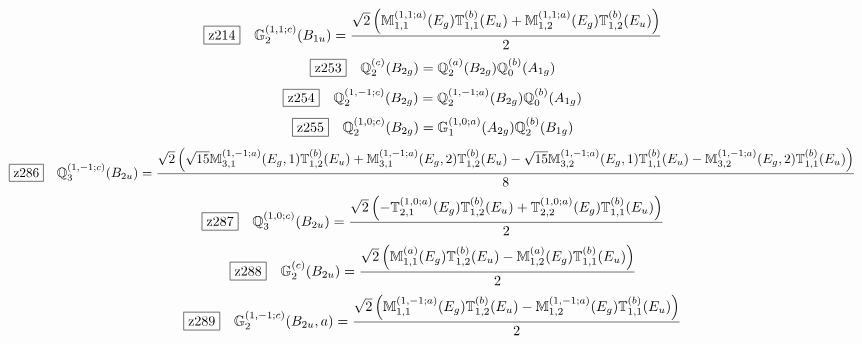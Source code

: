 \documentclass[fleqn,10pt,landscape]{jsarticle}
\begin{document}
\begin{dmath*}
\hspace*{3mm}\fbox{z214}\quad \mathbb{G}_{2}^{(1,1;c)}(B_{1u})=\frac{\sqrt{2} \left(\mathbb{M}_{1,1}^{(1,1;a)}(E_{g}) \mathbb{T}_{1,1}^{(b)}(E_{u}) + \mathbb{M}_{1,2}^{(1,1;a)}(E_{g}) \mathbb{T}_{1,2}^{(b)}(E_{u})\right)}{2}
\end{dmath*}
\begin{dmath*}
\hspace*{3mm}\fbox{z253}\quad \mathbb{Q}_{2}^{(c)}(B_{2g})=\mathbb{Q}_{2}^{(a)}(B_{2g}) \mathbb{Q}_{0}^{(b)}(A_{1g})
\end{dmath*}
\begin{dmath*}
\hspace*{3mm}\fbox{z254}\quad \mathbb{Q}_{2}^{(1,-1;c)}(B_{2g})=\mathbb{Q}_{2}^{(1,-1;a)}(B_{2g}) \mathbb{Q}_{0}^{(b)}(A_{1g})
\end{dmath*}
\begin{dmath*}
\hspace*{3mm}\fbox{z255}\quad \mathbb{Q}_{2}^{(1,0;c)}(B_{2g})=\mathbb{G}_{1}^{(1,0;a)}(A_{2g}) \mathbb{Q}_{2}^{(b)}(B_{1g})
\end{dmath*}
\begin{dmath*}
\hspace*{3mm}\fbox{z286}\quad \mathbb{Q}_{3}^{(1,-1;c)}(B_{2u})=\frac{\sqrt{2} \left(\sqrt{15} \mathbb{M}_{3,1}^{(1,-1;a)}(E_{g},1) \mathbb{T}_{1,2}^{(b)}(E_{u}) + \mathbb{M}_{3,1}^{(1,-1;a)}(E_{g},2) \mathbb{T}_{1,2}^{(b)}(E_{u}) - \sqrt{15} \mathbb{M}_{3,2}^{(1,-1;a)}(E_{g},1) \mathbb{T}_{1,1}^{(b)}(E_{u}) - \mathbb{M}_{3,2}^{(1,-1;a)}(E_{g},2) \mathbb{T}_{1,1}^{(b)}(E_{u})\right)}{8}
\end{dmath*}
\begin{dmath*}
\hspace*{3mm}\fbox{z287}\quad \mathbb{Q}_{3}^{(1,0;c)}(B_{2u})=\frac{\sqrt{2} \left(- \mathbb{T}_{2,1}^{(1,0;a)}(E_{g}) \mathbb{T}_{1,2}^{(b)}(E_{u}) + \mathbb{T}_{2,2}^{(1,0;a)}(E_{g}) \mathbb{T}_{1,1}^{(b)}(E_{u})\right)}{2}
\end{dmath*}
\begin{dmath*}
\hspace*{3mm}\fbox{z288}\quad \mathbb{G}_{2}^{(c)}(B_{2u})=\frac{\sqrt{2} \left(\mathbb{M}_{1,1}^{(a)}(E_{g}) \mathbb{T}_{1,2}^{(b)}(E_{u}) - \mathbb{M}_{1,2}^{(a)}(E_{g}) \mathbb{T}_{1,1}^{(b)}(E_{u})\right)}{2}
\end{dmath*}
\begin{dmath*}
\hspace*{3mm}\fbox{z289}\quad \mathbb{G}_{2}^{(1,-1;c)}(B_{2u},a)=\frac{\sqrt{2} \left(\mathbb{M}_{1,1}^{(1,-1;a)}(E_{g}) \mathbb{T}_{1,2}^{(b)}(E_{u}) - \mathbb{M}_{1,2}^{(1,-1;a)}(E_{g}) \mathbb{T}_{1,1}^{(b)}(E_{u})\right)}{2}
\end{dmath*}
\end{document}

